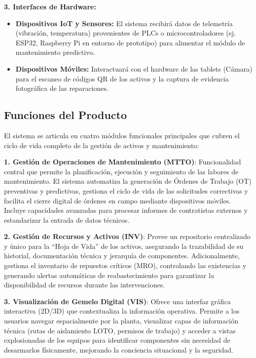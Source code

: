 \textbf{3. Interfaces de Hardware:}
\begin{itemize}
    \item \textbf{Dispositivos IoT y Sensores:} El sistema recibirá datos de telemetría (vibración, temperatura) provenientes de PLCs o microcontroladores (ej. ESP32, Raspberry Pi en entorno de prototipo) para alimentar el módulo de mantenimiento predictivo.
    \item \textbf{Dispositivos Móviles:} Interactuará con el hardware de las tablets (Cámara) para el escaneo de códigos QR de los activos y la captura de evidencia fotográfica de las reparaciones.
\end{itemize}

\subsection{Funciones del Producto}
El sistema se articula en cuatro módulos funcionales principales que cubren el ciclo de vida completo de la gestión de activos y mantenimiento:

\textbf{1. Gestión de Operaciones de Mantenimiento (MTTO)}: Funcionalidad central que permite la planificación, ejecución y seguimiento de las labores de mantenimiento. El sistema automatiza la generación de Órdenes de Trabajo (OT) preventivas y predictivas, gestiona el ciclo de vida de las solicitudes correctivas y facilita el cierre digital de órdenes en campo mediante dispositivos móviles. Incluye capacidades avanzadas para procesar informes de contratistas externos y estandarizar la entrada de datos técnicos.

\textbf{2. Gestión de Recursos y Activos (INV)}: Provee un repositorio centralizado y único para la ``Hoja de Vida'' de los activos, asegurando la trazabilidad de su historial, documentación técnica y jerarquía de componentes. Adicionalmente, gestiona el inventario de repuestos críticos (MRO), controlando las existencias y generando alertas automáticas de reabastecimiento para garantizar la disponibilidad de recursos durante las intervenciones.

\textbf{3. Visualización de Gemelo Digital (VIS)}: Ofrece una interfaz gráfica interactiva (2D/3D) que contextualiza la información operativa. Permite a los usuarios navegar espacialmente por la planta, visualizar capas de información técnica (rutas de aislamiento LOTO, permisos de trabajo) y acceder a vistas explosionadas de los equipos para identificar componentes sin necesidad de desarmarlos físicamente, mejorando la conciencia situacional y la seguridad.

